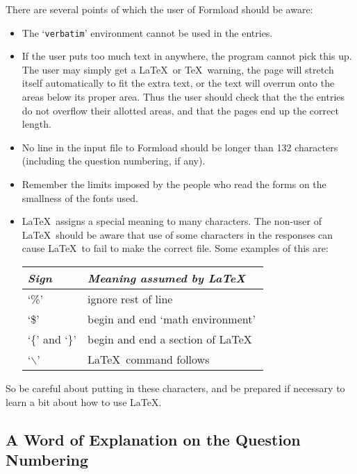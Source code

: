 There are several points of which the user of Formload should be aware:

\begin{itemize}

\item The `{\tt verbatim}' environment cannot be used in the entries.

\item If the user puts too much text in anywhere, the program cannot pick
this up. The user may simply get a \LaTeX\ or \TeX\ warning, the page will
stretch itself automatically to fit the extra text, or the text will
overrun onto the areas below its proper area. Thus the user
should check that the the entries do not overflow their allotted areas, and
that the pages end up the correct length. 

\item No line in the input file to Formload should be longer than 132
characters (including the question numbering, if any). 

\item Remember the limits imposed by the people who read the forms on the
smallness of the fonts used. 

\item \LaTeX\ assigns a special meaning to many characters. The non-user of
\LaTeX\  should be aware that use of some characters in the responses can
cause \LaTeX\ to fail to make the correct file. Some examples of this are: 

\begin{center}
\begin{tabular}{|l|l|} \hline
  {\it Sign}     &  {\it Meaning assumed by \LaTeX\ } \\ \hline \hline
 `\%'            &  ignore rest of line \\ \hline
 `\$'            &  begin and end `math environment' \\ \hline
 `\{' and `\}'   &  begin and end a section of \LaTeX\ \\ \hline
 `$\backslash$'  &  \LaTeX\ command follows \\ \hline
\end{tabular}
\end{center}
\end{itemize}

So be careful about putting in these characters, and be prepared if
necessary to learn a bit about how to use \LaTeX . 

\subsection{A Word of Explanation on the Question Numbering}

